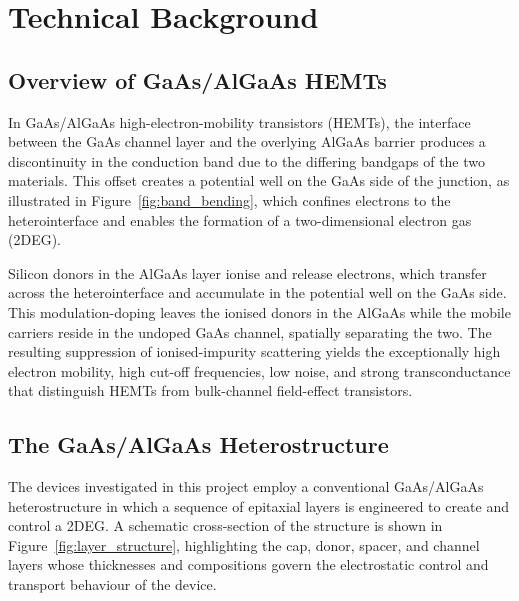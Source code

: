 \chapter{Technical Background}
\label{ch:technical-background}

\section{Overview of GaAs/AlGaAs HEMTs}

In GaAs/AlGaAs high-electron-mobility transistors (HEMTs), the interface
between the GaAs channel layer and the overlying AlGaAs barrier produces
a discontinuity in the conduction band due to the differing bandgaps of
the two materials. This offset creates a potential well on the GaAs side
of the junction, as illustrated in Figure~\ref{fig:band_bending}, which
confines electrons to the heterointerface and enables the formation of a
two-dimensional electron gas (2DEG).

\vspace{2mm}

Silicon donors in the AlGaAs layer ionise and release electrons, which
transfer across the heterointerface and accumulate in the potential
well on the GaAs side. This modulation-doping leaves the
ionised donors in the AlGaAs while the mobile carriers reside in the
undoped GaAs channel, spatially separating the two. The resulting
suppression of ionised-impurity scattering yields the exceptionally
high electron mobility, high cut-off frequencies, low noise, and
strong transconductance that distinguish HEMTs from bulk-channel
field-effect transistors. \cite{liu1999}



\section{The GaAs/AlGaAs Heterostructure}

The devices investigated in this project employ a conventional
GaAs/AlGaAs heterostructure in which a sequence of epitaxial layers is
engineered to create and control a 2DEG. A schematic cross-section of
the structure is shown in Figure~\ref{fig:layer_structure}, highlighting
the cap, donor, spacer, and channel layers whose thicknesses and
compositions govern the electrostatic control and transport behaviour of
the device.


\vspace{2mm}

